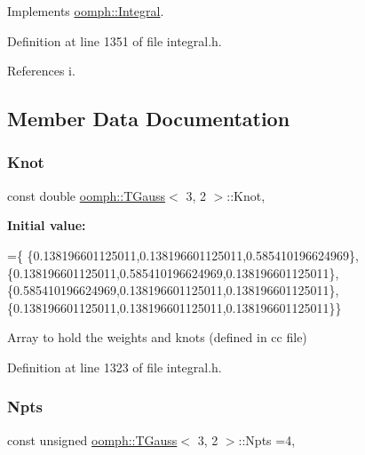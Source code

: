 Implements \hyperlink{classoomph_1_1Integral_ac65335e2aab120b285b3d6c294507b06}{oomph\+::\+Integral}.



Definition at line 1351 of file integral.\+h.



References i.



\subsection{Member Data Documentation}
\mbox{\label{classoomph_1_1TGauss_3_013_00_012_01_4_a692944c162c388b34db5750db08a092e}} 
\subsubsection{\texorpdfstring{Knot}{Knot}}
{\footnotesize\ttfamily const double \hyperlink{classoomph_1_1TGauss}{oomph\+::\+T\+Gauss}$<$ 3, 2 $>$\+::Knot\hspace{0.3cm}{\ttfamily [static]}, {\ttfamily [private]}}

{\bfseries Initial value\+:}
\begin{DoxyCode}
=\{
 \{0.138196601125011,0.138196601125011,0.585410196624969\},
 \{0.138196601125011,0.585410196624969,0.138196601125011\},
 \{0.585410196624969,0.138196601125011,0.138196601125011\},
 \{0.138196601125011,0.138196601125011,0.138196601125011\}\}
\end{DoxyCode}


Array to hold the weights and knots (defined in cc file) 



Definition at line 1323 of file integral.\+h.

\mbox{\label{classoomph_1_1TGauss_3_013_00_012_01_4_a70f1dcbd8c967a9e035f50899e6780be}} 
\subsubsection{\texorpdfstring{Npts}{Npts}}
{\footnotesize\ttfamily const unsigned \hyperlink{classoomph_1_1TGauss}{oomph\+::\+T\+Gauss}$<$ 3, 2 $>$\+::Npts =4\hspace{0.3cm}{\ttfamily [static]}, {\ttfamily [private]}}



